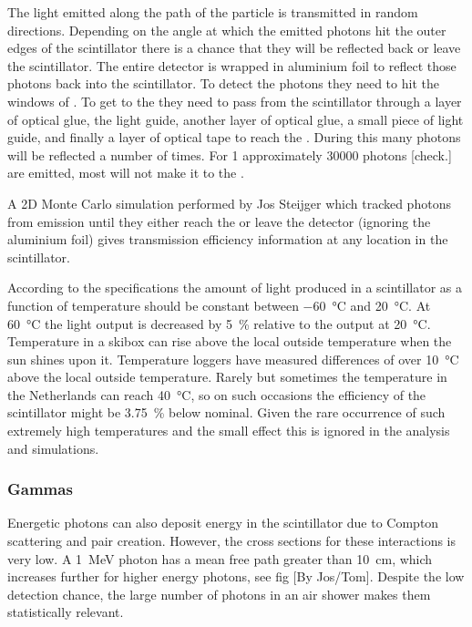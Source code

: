 The light emitted along
the path of the particle is transmitted in random directions. Depending
on the angle at which the emitted photons hit the outer edges of the
scintillator there is a chance that they will be reflected back or leave
the scintillator. The entire detector is wrapped in aluminium foil
to reflect those photons back into the scintillator. To
detect the photons they need to hit the windows of \pmt. To get to the
\pmt they need to pass from the scintillator through a layer of optical
glue, the light guide, another layer of optical glue, a small piece of
light guide, and finally a layer of optical tape to reach the \pmt.
During this many photons will be reflected a number of times. For
\SI{1}{\mip} approximately 30000 photons [check.] are emitted, most will
not make it to the \pmt.


A 2D Monte Carlo simulation performed by Jos Steijger which tracked
photons from emission until they either reach the \pmt or leave the
detector (ignoring the aluminium foil) gives transmission efficiency
information at any location in the scintillator.



According to the specifications the amount of light produced in a scintillator as a function of temperature should be constant between \SI{-60}{\degreeCelsius} and \SI{20}{\degreeCelsius}. At \SI{60}{\degreeCelsius} the light output is decreased by \SI{5}{\percent} relative to the output at \SI{20}{\degreeCelsius}. Temperature in a skibox can rise above the local outside temperature when the sun shines upon it. Temperature loggers have measured differences of over \SI{10}{\degreeCelsius} above the local outside temperature. Rarely but sometimes the temperature in the Netherlands can reach \SI{40}{\degreeCelsius}, so on such occasions the efficiency of the scintillator might be \SI{3.75}{\percent} below nominal. Given the rare occurrence of such extremely high temperatures and the small effect this is ignored in the analysis and simulations.



\subsubsection{Gammas}


Energetic photons can also deposit energy in the scintillator due to Compton scattering and pair creation. However, the cross sections for these interactions is very low. A \SI{1}{\MeV} photon  has a mean free path greater than \SI{10}{\centi\meter}, which increases further for higher energy photons, see fig [By Jos/Tom]. Despite the low detection chance, the large number of photons in an air shower makes them statistically relevant.



